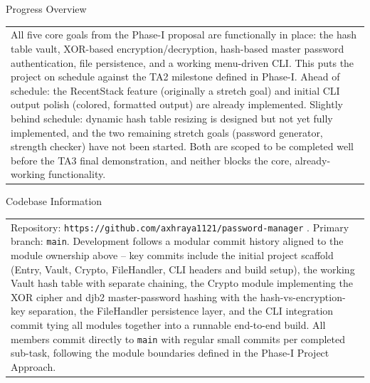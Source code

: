\documentclass[12pt,a4paper]{article}
\newcommand{\sectiontitle}[1]{%
    {\color{GEUBlue}
    \fontsize{18}{22}\selectfont #1}
}
\newcommand{\answerbox}[2][]{%
    \begin{tabularx}{\textwidth}{
        |>{\raggedright\arraybackslash}X|}
        \hline
        \parbox[t]{\dimexpr\linewidth-12pt\relax}{
            \vspace{5pt}
            \fontsize{11}{13}\selectfont #2
            \vspace{5pt}
        }\\
        \hline
    \end{tabularx}
}
\begin{document}
\vspace{0.75cm}

\sectiontitle{Progress Overview}

\vspace{0.05cm}


\vspace{0.25cm}

\answerbox{All five core goals from the Phase-I proposal are functionally in place: the hash table vault, XOR-based encryption/decryption, hash-based master password authentication, file persistence, and a working menu-driven CLI. This puts the project on schedule against the TA2 milestone defined in Phase-I. Ahead of schedule: the RecentStack feature (originally a stretch goal) and initial CLI output polish (colored, formatted output) are already implemented. Slightly behind schedule: dynamic hash table resizing is designed but not yet fully implemented, and the two remaining stretch goals (password generator, strength checker) have not been started. Both are scoped to be completed well before the TA3 final demonstration, and neither blocks the core, already-working functionality.}

\newpage


\vspace*{0.20cm}

\sectiontitle{Codebase Information }

\vspace{0.05cm}



\vspace{0.20cm}

\answerbox{Repository: \texttt{https://github.com/axhraya1121/password-manager} . Primary branch: \texttt{main}. Development follows a modular commit history aligned to the module ownership above -- key commits include the initial project scaffold (Entry, Vault, Crypto, FileHandler, CLI headers and build setup), the working Vault hash table with separate chaining, the Crypto module implementing the XOR cipher and djb2 master-password hashing with the hash-vs-encryption-key separation, the FileHandler persistence layer, and the CLI integration commit tying all modules together into a runnable end-to-end build. All members commit directly to \texttt{main} with regular small commits per completed sub-task, following the module boundaries defined in the Phase-I Project Approach.}
\end{document}
